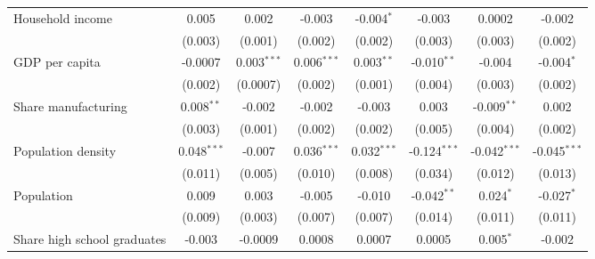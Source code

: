 \begin{table}[htbp]
\begin{tabular}{lccccccc}
      Household income                                        & 0.005                & 0.002                 & -0.003                & -0.004$^{*}$   & -0.003         & 0.0002         & -0.002\\   
                                                              & (0.003)              & (0.001)               & (0.002)               & (0.002)        & (0.003)        & (0.003)        & (0.002)\\   
      GDP per capita                                          & -0.0007              & 0.003$^{***}$         & 0.006$^{***}$         & 0.003$^{**}$   & -0.010$^{**}$  & -0.004         & -0.004$^{*}$\\   
                                                              & (0.002)              & (0.0007)              & (0.002)               & (0.001)        & (0.004)        & (0.003)        & (0.002)\\   
      Share manufacturing                                     & 0.008$^{**}$         & -0.002                & -0.002                & -0.003         & 0.003          & -0.009$^{**}$  & 0.002\\   
                                                              & (0.003)              & (0.001)               & (0.002)               & (0.002)        & (0.005)        & (0.004)        & (0.002)\\   
      Population density                                      & 0.048$^{***}$        & -0.007                & 0.036$^{***}$         & 0.032$^{***}$  & -0.124$^{***}$ & -0.042$^{***}$ & -0.045$^{***}$\\   
                                                              & (0.011)              & (0.005)               & (0.010)               & (0.008)        & (0.034)        & (0.012)        & (0.013)\\   
      Population                                              & 0.009                & 0.003                 & -0.005                & -0.010         & -0.042$^{**}$  & 0.024$^{*}$    & -0.027$^{*}$\\   
                                                              & (0.009)              & (0.003)               & (0.007)               & (0.007)        & (0.014)        & (0.011)        & (0.011)\\   
      Share high school graduates                             & -0.003               & -0.0009               & 0.0008                & 0.0007         & 0.0005         & 0.005$^{*}$    & -0.002\\   

\end{tabular}
\end{table}
